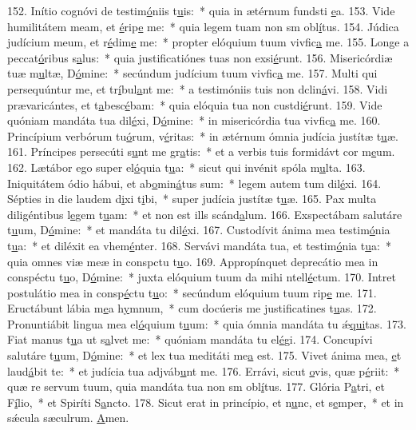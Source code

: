 152. Inítio cognóvi de testim\uline{ó}niis t\uline{u}is:~* quia in ætérnum fundsti \uline{e}a.
153. Vide humilitátem meam, et \uline{é}rip\uline{e} me:~* quia legem tuam non sm obl\uline{í}tus.
154. Júdica judícium meum, et r\uline{é}dim\uline{e} me:~* propter elóquium tuum vivfic\uline{a} me.
155. Longe a peccat\uline{ó}ribus s\uline{a}lus:~* quia justificatiónes tuas non exsi\uline{é}runt.
156. Misericórdiæ tuæ m\uline{u}ltæ, D\uline{ó}mine:~* secúndum judícium tuum vivfic\uline{a} me.
157. Multi qui persequúntur me, et tr\uline{í}bul\uline{a}nt me:~* a testimóniis tuis non dclin\uline{á}vi.
158. Vidi prævaricántes, et t\uline{a}besc\uline{é}bam:~* quia elóquia tua non custdi\uline{é}runt.
159. Vide quóniam mandáta tua dil\uline{é}xi, D\uline{ó}mine:~* in misericórdia tua vivfic\uline{a} me.
160. Princípium verbórum tu\uline{ó}rum, v\uline{é}ritas:~* in ætérnum ómnia judícia justítæ t\uline{u}æ.
161. Príncipes persecúti s\uline{u}nt me gr\uline{a}tis:~* et a verbis tuis formidávt cor m\uline{e}um.
162. Lætábor ego super el\uline{ó}quia t\uline{u}a:~* sicut qui invénit spóla m\uline{u}lta.
163. Iniquitátem ódio hábui, et ab\uline{o}min\uline{á}tus sum:~* legem autem tum dil\uline{é}xi.
164. Sépties in die laudem d\uline{i}xi t\uline{i}bi,~* super judícia justítæ t\uline{u}æ.
165. Pax multa diligéntibus l\uline{e}gem t\uline{u}am:~* et non est ills scánd\uline{a}lum.
166. Exspectábam salutáre t\uline{u}um, D\uline{ó}mine:~* et mandáta tu dil\uline{é}xi.
167. Custodívit ánima mea testim\uline{ó}nia t\uline{u}a:~* et diléxit ea vhem\uline{é}nter.
168. Servávi mandáta tua, et testim\uline{ó}nia t\uline{u}a:~* quia omnes viæ meæ in conspctu t\uline{u}o.
169. Appropínquet deprecátio mea in conspéctu t\uline{u}o, D\uline{ó}mine:~* juxta elóquium tuum da mihi ntell\uline{é}ctum.
170. Intret postulátio mea in consp\uline{é}ctu t\uline{u}o:~* secúndum elóquium tuum rip\uline{e} me.
171. Eructábunt lábia m\uline{e}a h\uline{y}mnum,~* cum docúeris me justificatines t\uline{u}as.
172. Pronuntiábit lingua mea el\uline{ó}quium t\uline{u}um:~* quia ómnia mandáta tu ǽ\uline{qui}tas.
173. Fiat manus t\uline{u}a ut s\uline{a}lvet me:~* quóniam mandáta tu el\uline{é}gi.
174. Concupívi salutáre t\uline{u}um, D\uline{ó}mine:~* et lex tua meditáti me\uline{a} est.
175. Vivet ánima mea, \uline{e}t laud\uline{á}bit te:~* et judícia tua adjváb\uline{u}nt me.
176. Errávi, sicut \uline{o}vis, quæ p\uline{é}riit:~* quæ re servum tuum, quia mandáta tua non sm obl\uline{í}tus.
177. Glória P\uline{a}tri, et F\uline{í}lio,~* et Spiríti S\uline{a}ncto.
178. Sicut erat in princípio, et n\uline{u}nc, et s\uline{e}mper,~* et in sǽcula sæculrum. \uline{A}men.
